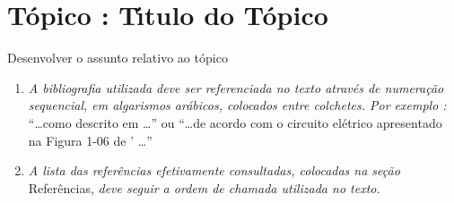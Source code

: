 \documentclass[a4paper,11pt]{article}
\begin{document}

\section{T{\'o}pico : T{\'\i}tulo do T{\'o}pico}
Desenvolver o assunto relativo ao t{\'o}pico
\begin{enumerate}
\item {\it A bibliografia utilizada deve ser referenciada no texto atrav{\'e}s de numera{\c c}{\~a}o sequencial, em algarismos ar{\'a}bicos, colocados entre colchetes. Por exemplo : } ``\ldots como descrito em \cite{b1} \ldots'' ou ``\ldots de acordo com o circuito el{\'e}trico apresentado na Figura 1-06 de \cite{b2}' \ldots''
\item {\it A lista das refer{\^e}ncias efetivamente consultadas, colocadas na se{\c c}{\~a}o} Refer{\^e}ncias, {\it deve seguir a ordem de chamada utilizada no texto.}
\end{enumerate} 
\end{document}

